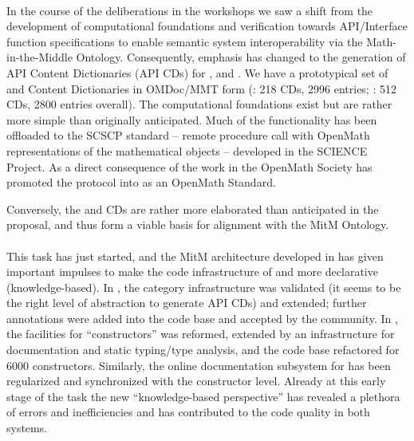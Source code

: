 \documentclass{deliverablereport}
\begin{document}
  \paragraph{}
  In the course of the deliberations in the  workshops we saw a shift from
  the development of computational foundations and verification towards API/Interface
  function specifications to enable semantic system interoperability via the
  Math-in-the-Middle Ontology. Consequently, emphasis has changed to the generation of API
  Content Dictionaries (API CDs) for \GAP, \LMFDB and \Sage. We have a prototypical set
  of \GAP and \Sage Content Dictionaries in OMDoc/MMT form (\GAP: 218 CDs, 2996 entries;
  \Sage: 512 CDs, 2800 entries overall). The computational foundations exist but are rather
  more simple than originally anticipated. Much of the functionality has been offloaded to
  the SCSCP standard -- remote procedure call with OpenMath representations of the
  mathematical objects -- developed in the SCIENCE Project. As a direct consequence of the
  work in \pn the OpenMath Society has promoted the \SCSCP protocol into as an OpenMath
  Standard.
  
  Conversely, the \GAP and \Sage CDs are rather more elaborated than anticipated in the
  proposal, and thus form a viable basis for alignment with the MitM Ontology.

  \paragraph{}
  This task has just started, and the MitM architecture developed in  has
  given important impulses to make the code infrastructure of \Sage and \GAP more
  declarative (knowledge-based). In \Sage, the category infrastructure was validated (it
  seems to be the right level of abstraction to generate API CDs) and extended; further
  annotations were added into the \Sage code base and accepted by the
  community. %
  In \GAP,
  the facilities for ``constructors'' was reformed, extended by an infrastructure for
  documentation and static typing/type analysis, and the code base refactored for 6000
  constructors. Similarly, the online documentation subsystem for \GAP has been regularized
  and synchronized with the constructor level. Already at this early stage of the task the
  new ``knowledge-based perspective'' has revealed a plethora of errors and inefficiencies
  and has contributed to the code quality in both systems. 
\end{document}
